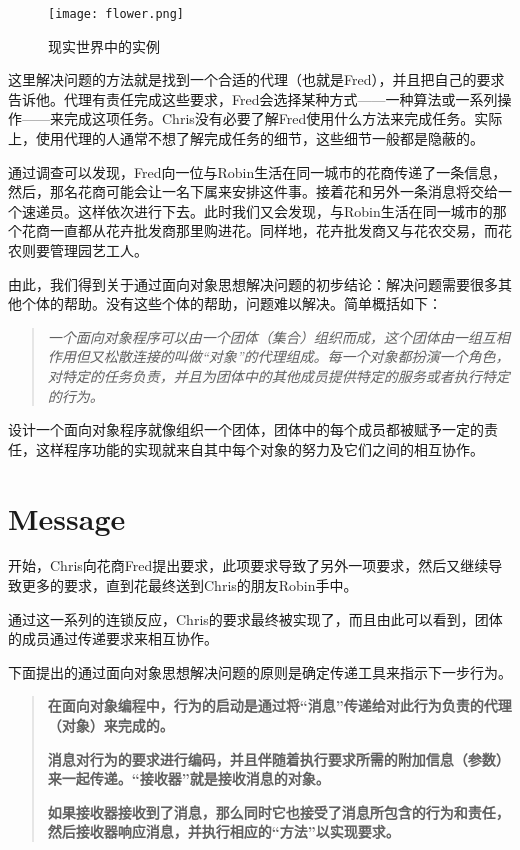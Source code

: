 \begin{figure}[htbp]
\centering
\texttt{[image: flower.png]}
\caption{现实世界中的实例}
\label{fig:flower}
\end{figure}

这里解决问题的方法就是找到一个合适的代理（也就是Fred），并且把自己的要求告诉他。代理有责任完成这些要求，Fred会选择某种方式——一种算法或一系列操作——来完成这项任务。Chris没有必要了解Fred使用什么方法来完成任务。实际上，使用代理的人通常不想了解完成任务的细节，这些细节一般都是隐蔽的。

通过调查可以发现，Fred向一位与Robin生活在同一城市的花商传递了一条信息，然后，那名花商可能会让一名下属来安排这件事。接着花和另外一条消息将交给一个速递员。这样依次进行下去。此时我们又会发现，与Robin生活在同一城市的那个花商一直都从花卉批发商那里购进花。同样地，花卉批发商又与花农交易，而花农则要管理园艺工人。

由此，我们得到关于通过面向对象思想解决问题的初步结论：解决问题需要很多其他个体的帮助。没有这些个体的帮助，问题难以解决。简单概括如下：

\begin{quote}
\emph{一个面向对象程序可以由一个团体（集合）组织而成，这个团体由一组互相作用但又松散连接的叫做“对象”的代理组成。每一个对象都扮演一个角色，对特定的任务负责，并且为团体中的其他成员提供特定的服务或者执行特定的行为。}
\end{quote}

设计一个面向对象程序就像组织一个团体，团体中的每个成员都被赋予一定的责任，这样程序功能的实现就来自其中每个对象的努力及它们之间的相互协作。

\section{Message}

开始，Chris向花商Fred提出要求，此项要求导致了另外一项要求，然后又继续导致更多的要求，直到花最终送到Chris的朋友Robin手中。

通过这一系列的连锁反应，Chris的要求最终被实现了，而且由此可以看到，团体的成员通过传递要求来相互协作。

下面提出的通过面向对象思想解决问题的原则是确定传递工具来指示下一步行为。

\begin{quote}
\textbf{在面向对象编程中，行为的启动是通过将“消息”传递给对此行为负责的代理（对象）来完成的。}

\textbf{消息对行为的要求进行编码，并且伴随着执行要求所需的附加信息（参数）来一起传递。“接收器”就是接收消息的对象。}

\textbf{如果接收器接收到了消息，那么同时它也接受了消息所包含的行为和责任，然后接收器响应消息，并执行相应的“方法”以实现要求。}
\end{quote}

